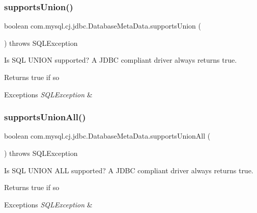 \subsubsection{\texorpdfstring{supports\+Union()}{supportsUnion()}}
{\footnotesize\ttfamily boolean com.\+mysql.\+cj.\+jdbc.\+Database\+Meta\+Data.\+supports\+Union (\begin{DoxyParamCaption}{ }\end{DoxyParamCaption}) throws S\+Q\+L\+Exception}

Is S\+QL U\+N\+I\+ON supported? A J\+D\+BC compliant driver always returns true.

\begin{DoxyReturn}{Returns}
true if so 
\end{DoxyReturn}

\begin{DoxyExceptions}{Exceptions}
{\em S\+Q\+L\+Exception} & \\
\hline
\end{DoxyExceptions}
\mbox{\label{classcom_1_1mysql_1_1cj_1_1jdbc_1_1_database_meta_data_a851dcebfa49467db3227e9db24e3f483}} 
\subsubsection{\texorpdfstring{supports\+Union\+All()}{supportsUnionAll()}}
{\footnotesize\ttfamily boolean com.\+mysql.\+cj.\+jdbc.\+Database\+Meta\+Data.\+supports\+Union\+All (\begin{DoxyParamCaption}{ }\end{DoxyParamCaption}) throws S\+Q\+L\+Exception}

Is S\+QL U\+N\+I\+ON A\+LL supported? A J\+D\+BC compliant driver always returns true.

\begin{DoxyReturn}{Returns}
true if so 
\end{DoxyReturn}

\begin{DoxyExceptions}{Exceptions}
{\em S\+Q\+L\+Exception} & \\
\hline
\end{DoxyExceptions}
\mbox{\label{classcom_1_1mysql_1_1cj_1_1jdbc_1_1_database_meta_data_a4b81920702dd25181720daaeee3af9f3}} 
